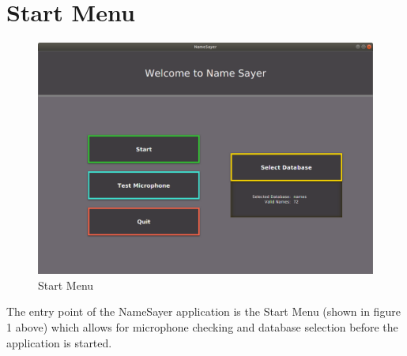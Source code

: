 \documentclass[a4paper,12pt]{article}
\begin{document}
\section{Start Menu}
\begin{figure}[!h]
	\includegraphics[width=\linewidth]{startmenu.png}
	\caption{Start Menu}
\end{figure}

The entry point of the NameSayer application is the Start Menu (shown in figure 1 above) which allows for microphone checking and database selection before the application is started.

\newpage
\end{document}
